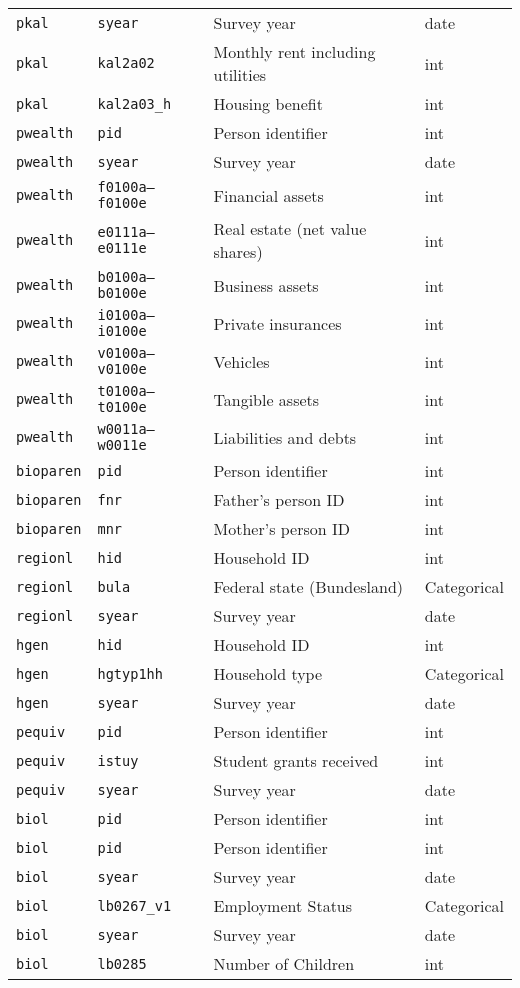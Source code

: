 \begin{longtable}{llll}
\texttt{pkal} & \texttt{syear} & Survey year & date \\
\texttt{pkal} & \texttt{kal2a02} & Monthly rent including utilities & int \\
\texttt{pkal} & \texttt{kal2a03\_h} & Housing benefit & int \\
\texttt{pwealth} & \texttt{pid} & Person identifier & int \\
\texttt{pwealth} & \texttt{syear} & Survey year & date \\
\texttt{pwealth} & \texttt{f0100a--f0100e} & Financial assets & int \\
\texttt{pwealth} & \texttt{e0111a--e0111e} & Real estate (net value shares) & int \\
\texttt{pwealth} & \texttt{b0100a--b0100e} & Business assets & int \\
\texttt{pwealth} & \texttt{i0100a--i0100e} & Private insurances & int \\
\texttt{pwealth} & \texttt{v0100a--v0100e} & Vehicles & int \\
\texttt{pwealth} & \texttt{t0100a--t0100e} & Tangible assets & int \\
\texttt{pwealth} & \texttt{w0011a--w0011e} & Liabilities and debts & int \\
\texttt{bioparen} & \texttt{pid} & Person identifier & int \\
\texttt{bioparen} & \texttt{fnr} & Father’s person ID & int \\
\texttt{bioparen} & \texttt{mnr} & Mother’s person ID & int \\
\texttt{regionl} & \texttt{hid} & Household ID & int \\
\texttt{regionl} & \texttt{bula} & Federal state (Bundesland) & Categorical \\
\texttt{regionl} & \texttt{syear} & Survey year & date \\
\texttt{hgen} & \texttt{hid} & Household ID & int \\
\texttt{hgen} & \texttt{hgtyp1hh} & Household type & Categorical \\
\texttt{hgen} & \texttt{syear} & Survey year & date \\
\texttt{pequiv} & \texttt{pid} & Person identifier & int \\
\texttt{pequiv} & \texttt{istuy} & Student grants received & int \\
\texttt{pequiv} & \texttt{syear} & Survey year & date \\
\texttt{biol} & \texttt{pid} & Person identifier & int \\
\texttt{biol} & \texttt{pid} & Person identifier & int \\
\texttt{biol} & \texttt{syear} & Survey year & date \\
\texttt{biol} & \texttt{lb0267\_v1} & Employment Status & Categorical \\
\texttt{biol} & \texttt{syear} & Survey year & date \\
\texttt{biol} & \texttt{lb0285} & Number of Children & int \\
\end{longtable}
